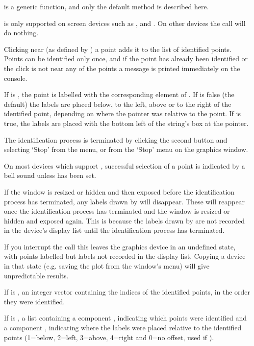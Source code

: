 \begin{Details}\relax
{} is a generic function, and only the default method is
described here.

 is only supported on screen devices such as
,  and .  On other devices the
call will do nothing.

Clicking near (as defined by ) a point adds it to the
list of identified points.  Points can be identified only once, and if
the point has already been identified or the click is not
near any of the points a message is printed immediately on
the \R{} console.

If  is , the point is labelled with the
corresponding element of .  If  is false (the
default) the labels are placed below, to the left, above or to the
right of the identified point, depending on where the pointer was
relative to the point.  If  is true, the
labels are placed with the bottom left of the string's box at the
pointer.

The identification process is terminated by clicking the second button
and selecting `Stop' from the menu, or from the `Stop'
menu on the graphics window.

On most devices which support , successful selection of
a point is indicated by a bell sound unless
 has been set.

If the window is resized or hidden and then exposed before the identification
process has terminated, any labels drawn by 
will disappear.  These will reappear once the identification process has 
terminated and the window is resized or hidden and exposed again.
This is because the labels drawn by  are not
recorded in the device's display list until the identification process has
terminated.

If you interrupt the  call this leaves the graphics
device in an undefined state, with points labelled but labels not
recorded in the display list.  Copying a device in that state
(e.g. saving the plot from the window's menu)
will give unpredictable results.
\end{Details}
%
\begin{Value}
If  is , an integer vector containing the
indices of the identified points, in the order they were identified.

If  is , a list containing a component
, indicating which points were identified and a component
, indicating where the labels were placed relative to the
identified points (1=below, 2=left, 3=above, 4=right and 0=no offset,
used if ).
\end{Value}
